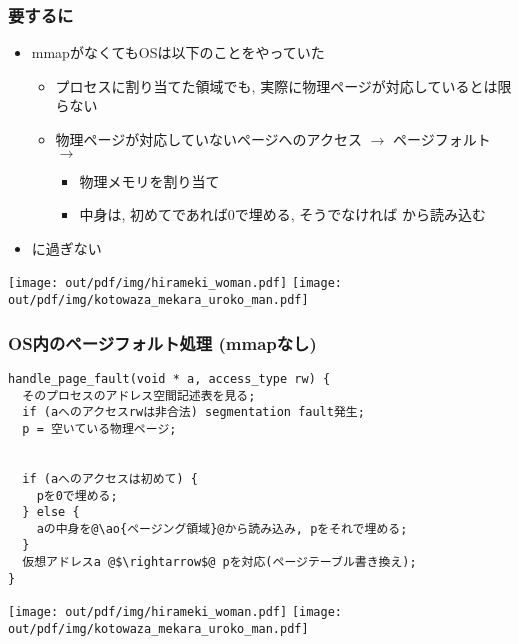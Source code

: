 \documentclass[12pt,dvipdfmx]{beamer}
\begin{document}
\begin{frame}
  \frametitle{要するに}
  \begin{itemize}
  \item mmapがなくてもOSは以下のことをやっていた
    \begin{itemize}
    \item プロセスに割り当てた領域でも, 実際に物理ページが対応しているとは限らない
    \item 物理ページが対応していないページへのアクセス $\rightarrow$ ページフォルト $\rightarrow$
      \begin{itemize}
      \item 物理メモリを割り当て
      \item 中身は, 初めてであれば0で埋める, そうでなければ
        から読み込む
      \end{itemize}
    \end{itemize}
  \item {}に過ぎない
  \end{itemize}


\begin{center}
  \texttt{[image: out/pdf/img/hirameki\_woman.pdf]}
  \texttt{[image: out/pdf/img/kotowaza\_mekara\_uroko\_man.pdf]}
\end{center}  
\end{frame}


\begin{frame}[fragile]
  \frametitle{OS内のページフォルト処理 (mmapなし)}
\begin{lstlisting}
handle_page_fault(void * a, access_type rw) {
  そのプロセスのアドレス空間記述表を見る;
  if (aへのアクセスrwは非合法) segmentation fault発生;
  p = 空いている物理ページ;


  if (aへのアクセスは初めて) {
    pを0で埋める;
  } else {
    aの中身を@\ao{ページング領域}@から読み込み, pをそれで埋める;
  }
  仮想アドレスa @$\rightarrow$@ pを対応(ページテーブル書き換え);
}
\end{lstlisting}
\begin{center}
  \texttt{[image: out/pdf/img/hirameki\_woman.pdf]}
  \texttt{[image: out/pdf/img/kotowaza\_mekara\_uroko\_man.pdf]}
\end{center}
\end{frame}
\end{document}
